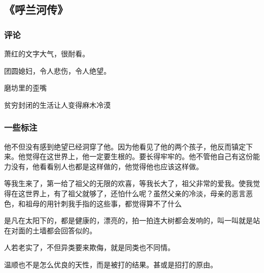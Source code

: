 \subsection{《呼兰河传》}
\subsubsection{评论}

萧红的文字大气，很耐看。

团圆媳妇，令人悲伤，令人绝望。

磨坊里的歪嘴

贫穷封闭的生活让人变得麻木冷漠

\subsubsection{一些标注}

他不但没有感到绝望已经洞穿了他。因为他看见了他的两个孩子，他反而镇定下来。他觉得在这世界上，他一定要生根的。要长得牢牢的。他不管他自己有这份能力没有，他看看别人也都是这样做的，他觉得他也应该这样做。

等我生来了，第一给了祖父的无限的欢喜，等我长大了，祖父非常的爱我。使我觉得在这世界上，有了祖父就够了，还怕什么呢？虽然父亲的冷淡，母亲的恶言恶色，和祖母的用针刺我手指的这些事，都觉得算不了什么

是凡在太阳下的，都是健康的，漂亮的，拍一拍连大树都会发响的，叫一叫就是站在对面的土墙都会回答似的。

人若老实了，不但异类要来欺侮，就是同类也不同情。

温顺也不是怎么优良的天性，而是被打的结果。甚或是招打的原由。